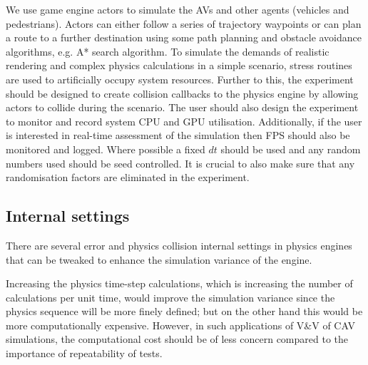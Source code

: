 We use game engine actors to simulate the AVs and other agents (vehicles and pedestrians). Actors can either follow a series of trajectory waypoints or can plan a route to a further destination using some path planning and obstacle avoidance algorithms, e.g. A* search algorithm. 
% 
To simulate the demands of realistic rendering and complex physics calculations in a simple scenario, stress routines are used to artificially occupy system resources. 
Further to this, the experiment should be designed to create collision callbacks to the physics engine by allowing actors to collide during the scenario. 
%
The user should also design the experiment to monitor and record system CPU and GPU utilisation. Additionally, if the user is interested in real-time assessment of the simulation then FPS should also be monitored and logged.
%
Where possible a fixed $dt$ should be used and any random numbers used should be seed controlled.
It is crucial to also make sure that any randomisation factors are eliminated in the experiment.
%
\subsection{Internal settings}
There are several error and physics collision internal settings in physics engines that can be tweaked to enhance the simulation variance of the engine.

Increasing the physics time-step calculations, which is increasing the number of calculations per unit time, would improve the simulation variance since the physics sequence will be more finely defined; but on the other hand this would be more computationally expensive. However, in such applications of V\&V of CAV simulations, the computational cost should be of less concern compared to the importance of repeatability of tests.

